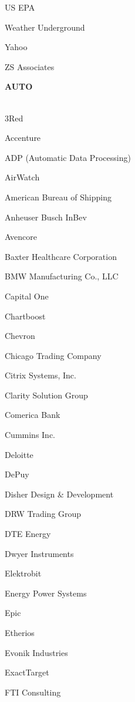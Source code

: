 \documentclass[twoside]{article}
\begin{document}
\begin{center}
\begin{multicols}{5}
\begin{FlushLeft}
\begin{compactitem}
\item US EPA
\item Weather Underground
\item Yahoo
\item ZS Associates
\end{compactitem}
        \end{FlushLeft}
        \vspace{1em}
        {\fontsize{14}{16}\selectfont \bf AUTO}\\
        \vspace{-1em}
        ~\hrulefill~
        \vspace{-.9em}
        \begin{FlushLeft}
        \begin{compactitem}
        \item 3Red
\item Accenture
\item ADP (Automatic Data Processing)
\item AirWatch
\item American Bureau of Shipping
\item Anheuser Busch InBev
\item Avencore
\item Baxter Healthcare Corporation
\item BMW Manufacturing Co., LLC
\item Capital One
\item Chartboost
\item Chevron
\item Chicago Trading Company
\item Citrix Systems, Inc.
\item Clarity Solution Group
\item Comerica Bank
\item Cummins Inc.
\item Deloitte
\item DePuy
\item Disher Design \& Development
\item DRW Trading Group
\item DTE Energy
\item Dwyer Instruments
\item Elektrobit
\item Energy Power Systems
\item Epic
\item Etherios
\item Evonik Industries
\item ExactTarget
\item FTI Consulting

\end{compactitem}
\end{FlushLeft}
\end{multicols}
\end{center}
\end{document}
